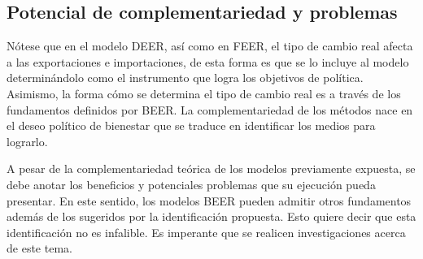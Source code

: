\documentclass[12pt,letterpaper]{article}
\begin{document}

\subsection*{Potencial de complementariedad y problemas}

Nótese que en el modelo DEER, así como en FEER, el tipo de cambio real afecta a las exportaciones e importaciones, de esta forma es que se lo incluye al modelo determinándolo como el instrumento que logra los objetivos de política. Asimismo, la forma cómo se determina el tipo de cambio real es a través de los fundamentos definidos por BEER. La complementariedad de los métodos nace en el deseo político de bienestar que se traduce en identificar los medios para lograrlo.

A pesar de la complementariedad teórica de los modelos previamente expuesta, se debe anotar los beneficios y potenciales problemas que su ejecución pueda presentar. En este sentido, los modelos BEER pueden admitir otros fundamentos además de los sugeridos por la identificación propuesta. Esto quiere decir que esta identificación no es infalible. Es imperante que se realicen investigaciones acerca de este tema. 
\end{document}
